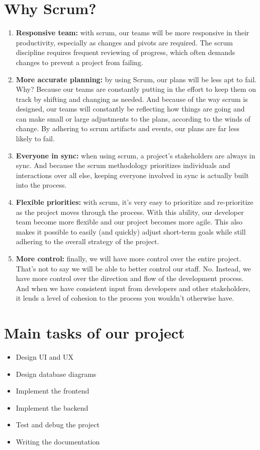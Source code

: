 \section{Why Scrum?}
\begin{enumerate}
	\item \textbf{Responsive team:} 
	with scrum, our teams will be more responsive in their productivity, especially as changes and pivots are required. The scrum discipline requires frequent reviewing of progress, which often demands changes to prevent a project from failing.
	
	\item \textbf{More accurate planning:}
	by using Scrum, our plans will be less apt to fail. Why? Because our teams are constantly putting in the effort to keep them on track by shifting and changing as needed. And because of the way scrum is designed, our teams will constantly be reflecting how things are going and can make small or large adjustments to the plans, according to the winds of change. By adhering to scrum artifacts and events, our plans are far less likely to fail.
	
	\item \textbf{Everyone in sync:}
	when using scrum, a project’s stakeholders are always in sync. And because the scrum methodology prioritizes individuals and interactions over all else, keeping everyone involved in sync is actually built into the process.
	
	\item \textbf{Flexible priorities:}
	with scrum, it’s very easy to prioritize and re-prioritize as the project moves through the process. With this ability, our developer team become more flexible and our project becomes more agile. This also makes it possible to easily (and quickly) adjust short-term goals while still adhering to the overall strategy of the project.
	
	\item \textbf{More control:}
	finally, we will have more control over the entire project. That’s not to say we will be able to better control our staff. No. Instead, we have more control over the direction and flow of the development process. And when we have consistent input from developers and other stakeholders, it lends a level of cohesion to the process you wouldn’t otherwise have.
\end{enumerate}

\section{Main tasks of our project}
\begin{itemize}
    \item Design UI and UX
    \item Design database diagrams
    \item Implement the frontend
    \item Implement the backend
    \item Test and debug the project
    \item Writing the documentation
\end{itemize}

